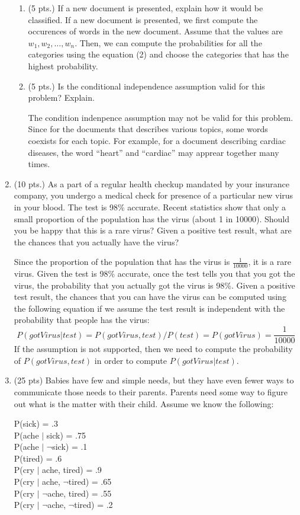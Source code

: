 \documentclass{article}%
\begin{document}
\begin{enumerate}
\begin{enumerate}
  		
  		\item (5 pts.) If a new document is presented, explain how it would be classified.
  		If a new document is presented, we first compute the occurences of words in the new document. Assume that the values are $w_1, w_2, \ldots, w_n$. Then, we can compute the probabilities for all the categories using the equation (2) and choose the categories that has the highest probability.
  		
		\item (5 pts.) Is the conditional independence assumption valid for this problem? Explain. 
		
		The condition indenpence assumption may not be valid for this problem. Since for the documents that describes various topics, some words coexists for each topic. For example, for a document describing cardiac diseases, the word ``heart'' and ``cardiac'' may apprear together many times. 
	\end{enumerate}

\item (10 pts.) As a part of a regular health checkup mandated by your insurance company, you undergo a medical check for presence of a particular new virus in your blood. The test is 98\% accurate. Recent statistics show that only a small proportion of the population has the virus (about 1 in 10000). Should you be happy that this is a rare virus? Given a positive test result, what are the chances that you actually have the virus? 

	Since the proportion of the population that has the virus is $\frac{1}{10000}$, it is a rare virus. Given the test is 98\% accurate, once the test tells you that you got the virus, the probability that you actually got the virus is 98\%. Given a positive test result, the chances that you can have the virus can be computed using the following equation if we assume the test result is independent with the probability that people has the virus: 
	\[
	P(gotVirus | test) = P(gotVirus,test)/P(test) = P(gotVirus) = \frac{1}{10000}
	\]
If the assumption is not supported, then we need to compute the probability of $P(gotVirus,test)$ in order to compute $P(gotVirus | test)$.

\item (25 pts) Babies have few and simple needs, but they have even fewer ways to communicate those needs to their parents. Parents need some way to figure out what is the matter with their child. Assume we know the following:

P(sick) = .3 \\
P(ache $|$ sick) = .75\\
P(ache $|$ $\neg$sick) = .1\\
P(tired) = .6\\
P(cry $|$ ache, tired) = .9\\
P(cry $|$ ache, $\neg$tired) = .65\\
P(cry $|$ $\neg$ache, tired) = .55\\
P(cry $|$ $\neg$ache, $\neg$tired) = .2\\


\end{enumerate}
\end{document}
